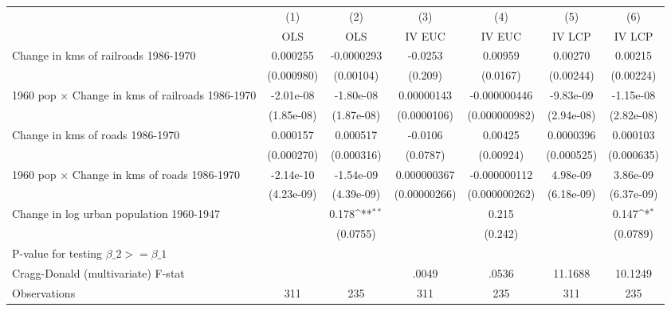 {
\def\sym#1{\ifmmode^{#1}\else\(^{#1}\)\fi}
\begin{tabular}{l*{6}{c}}
\hline\hline
                &\multicolumn{1}{c}{(1)}&\multicolumn{1}{c}{(2)}&\multicolumn{1}{c}{(3)}&\multicolumn{1}{c}{(4)}&\multicolumn{1}{c}{(5)}&\multicolumn{1}{c}{(6)}\\
                &\multicolumn{1}{c}{OLS}&\multicolumn{1}{c}{OLS}&\multicolumn{1}{c}{IV EUC}&\multicolumn{1}{c}{IV EUC}&\multicolumn{1}{c}{IV LCP}&\multicolumn{1}{c}{IV LCP}\\
\hline
Change in kms of railroads 1986-1970& 0.000255         &-0.0000293         &  -0.0253         &  0.00959         &  0.00270         &  0.00215         \\
                &(0.000980)         &(0.00104)         &  (0.209)         & (0.0167)         &(0.00244)         &(0.00224)         \\
[1em]
1960 pop $\times$ Change in kms of railroads 1986-1970&-2.01e-08         &-1.80e-08         &0.00000143         &-0.000000446         &-9.83e-09         &-1.15e-08         \\
                &(1.85e-08)         &(1.87e-08)         &(0.0000106)         &(0.000000982)         &(2.94e-08)         &(2.82e-08)         \\
[1em]
Change in kms of roads 1986-1970& 0.000157         & 0.000517         &  -0.0106         &  0.00425         &0.0000396         & 0.000103         \\
                &(0.000270)         &(0.000316)         & (0.0787)         &(0.00924)         &(0.000525)         &(0.000635)         \\
[1em]
1960 pop $\times$ Change in kms of roads 1986-1970&-2.14e-10         &-1.54e-09         &0.000000367         &-0.000000112         & 4.98e-09         & 3.86e-09         \\
                &(4.23e-09)         &(4.39e-09)         &(0.00000266)         &(0.000000262)         &(6.18e-09)         &(6.37e-09)         \\
[1em]
Change in log urban population 1960-1947&                  &    0.178\sym{**} &                  &    0.215         &                  &    0.147\sym{*}  \\
                &                  & (0.0755)         &                  &  (0.242)         &                  & (0.0789)         \\
\hline
P-value for testing $\beta\_{2} >= \beta\_{1}$&                  &                  &                  &                  &                  &                  \\
Cragg-Donald (multivariate) F-stat&                  &                  &    .0049         &    .0536         &  11.1688         &  10.1249         \\
Observations    &      311         &      235         &      311         &      235         &      311         &      235         \\
\hline\hline
\end{tabular}
}
